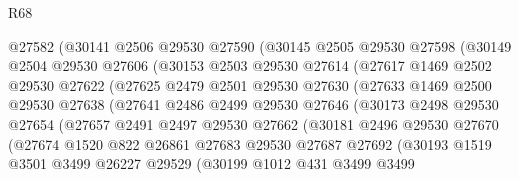 \begin{lexlean}{R68}
\begin{coremodule}
                @27582
                (@30141
                  @2506
                  @29530
                  @27590
                  (@30145
                    @2505
                    @29530
                    @27598
                    (@30149
                      @2504
                      @29530
                      @27606
                      (@30153
                        @2503
                        @29530
                        @27614
                        (@27617
                          @1469
                          @2502
                          @29530
                          @27622
                          (@27625
                            @2479
                            @2501
                            @29530
                            @27630
                            (@27633
                              @1469
                              @2500
                              @29530
                              @27638
                              (@27641
                                @2486
                                @2499
                                @29530
                                @27646
                                (@30173
                                  @2498
                                  @29530
                                  @27654
                                  (@27657
                                    @2491
                                    @2497
                                    @29530
                                    @27662
                                    (@30181
                                      @2496
                                      @29530
                                      @27670
                                      (@27674
                                        @1520
                                        @822
                                        @26861
                                        @27683
                                        @29530
                                        @27687
                                        @27692
                                        (@30193
                                          @1519
                                          @3501
                                          @3499
                                          @26227
                                          @29529
                                          (@30199
                                            @1012
                                            @431
                                            @3499
                                            @3499

\end{coremodule}
\end{lexlean}
